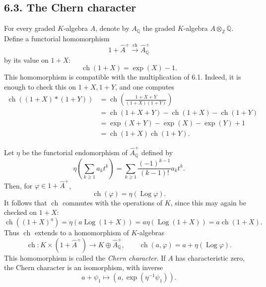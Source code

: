 \documentclass[13pt]{extarticle}
\newcommand{\ZZ}{\mathbb Z}
\newcommand{\QQ}{\mathbb Q}
\newcommand{\ch}{\operatorname{ch}}
\newcommand{\Log}{\operatorname{Log}}
\begin{document}
\subsection*{6.3. The Chern character}
For every graded $K$-algebra $A$, denote by $A_{\QQ}$ the graded $K$-algebra $A\otimes_{\ZZ}\QQ$. Define a functorial homomorphism
\[
1+\widehat A^+\xrightarrow{\ch}\widehat A_{\QQ}^+
\]
by its value on $1+X$:
\begin{equation}\label{eq:6.3.1}
\ch(1+X)=\exp(X)-1.
\end{equation}
This homomorphism is compatible with the multiplication of 6.1. Indeed, it is enough to check this on $1+X,1+Y$, and one computes
\begin{align*}
\ch((1+X)*(1+Y))
&=\ch\left(\frac{1+X+Y}{(1+X)(1+Y)}\right)\\
&=\ch(1+X+Y)-\ch(1+X)-\ch(1+Y)\\
&=\exp(X+Y)-\exp(X)-\exp(Y)+1\\
&=\ch(1+X)\ch(1+Y).
\end{align*}

Let $\eta$ be the functorial endomorphism of $\widehat A_{\QQ}^+$ defined by
\[
\eta\left(\sum_{k\geq 1}a_kt^k\right)=\sum_{k\geq 1}\frac{(-1)^{k-1}}{(k-1)!}a_kt^k.
\]
Then, for $\varphi\in 1+\widehat A^+$,
\begin{equation}\label{eq:6.3.2}
\ch(\varphi)=\eta(\Log\varphi).
\end{equation}
It follows that $\ch$ commutes with the operations of $K$, since this may again be checked on $1+X$:
\[
\ch((1+X)^a)=\eta(a\Log(1+X))=a\eta(\Log(1+X))=a\ch(1+X).
\]
Thus $\ch$ extends to a homomorphism of $K$-algebras
\begin{equation}\label{eq:6.3.3}
\ch:K\times(1+\widehat A^+)\longrightarrow K\oplus\widehat A_{\QQ}^+,
\qquad
\ch(a,\varphi)=a+\eta(\Log\varphi).
\end{equation}
This homomorphism is called the \emph{Chern character}. If $A$ has characteristic zero, the Chern character is an isomorphism, with inverse
\[
a+\psi_1\longmapsto (a,\exp(\eta^{-1}\psi_1)).
\]
\end{document}

